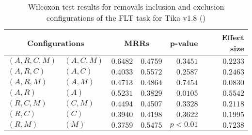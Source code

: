 
\begin{table}
\begin{spacing}{1.2}
\centering
\caption{Wilcoxon test results for removals inclusion and exclusion configurations of the FLT task for Tika v1.8 (\ctwo)}
\label{table:versus-wilcox-tika-flt-removals}
\begin{tabular}{ll|rr|rr}
\toprule
      \multicolumn{2}{c|}{Configurations} &                \multicolumn{2}{c|}{MRRs} &             p-value & Effect size \\
\midrule
 $(A,R,C,M)$ &  $(A,C,M)$ &  $\bm{0.6482}$ &       $0.4759$ & $0.3451$ &    $0.2233$ \\
   $(A,R,C)$ &    $(A,C)$ &       $0.4033$ &  $\bm{0.5572}$ & $0.2587$ &    $0.2463$ \\
   $(A,R,M)$ &    $(A,M)$ &       $0.4713$ &  $\bm{0.4864}$ & $0.7454$ &    $0.0830$ \\
     $(A,R)$ &      $(A)$ &  $\bm{0.5231}$ &       $0.3829$ & $0.0105$ &    $0.5542$ \\
   $(R,C,M)$ &    $(C,M)$ &       $0.4494$ &  $\bm{0.4507}$ & $0.3328$ &    $0.2118$ \\
     $(R,C)$ &      $(C)$ &       $0.3940$ &  $\bm{0.4198}$ & $0.3622$ &    $0.1995$ \\
     $(R,M)$ &      $(M)$ &       $0.3759$ &  $\bm{0.5475}$ & $p<0.01$ &    $0.7238$ \\
\bottomrule
\end{tabular}

\end{spacing}
\end{table}

